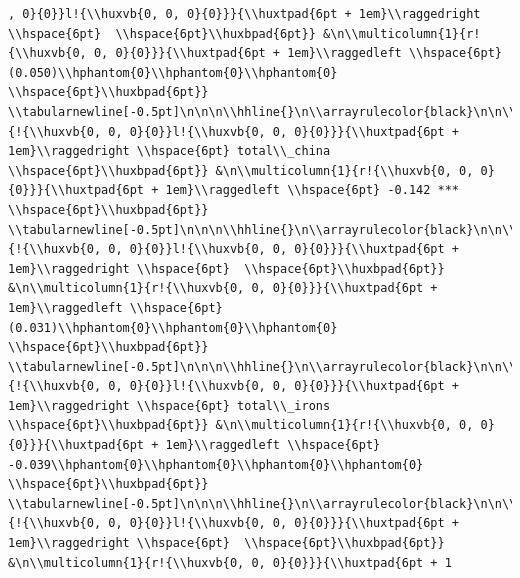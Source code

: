 \documentclass[11pt,preprint, authoryear]{elsarticle}
\numberwithin{equation}{section}
\numberwithin{figure}{section}
\numberwithin{table}{section}
\begin{document}
\begin{verbatim}
, 0}{0}}l!{\\huxvb{0, 0, 0}{0}}}{\\huxtpad{6pt + 1em}\\raggedright \\hspace{6pt}  \\hspace{6pt}\\huxbpad{6pt}} &\n\\multicolumn{1}{r!{\\huxvb{0, 0, 0}{0}}}{\\huxtpad{6pt + 1em}\\raggedleft \\hspace{6pt} (0.050)\\hphantom{0}\\hphantom{0}\\hphantom{0} \\hspace{6pt}\\huxbpad{6pt}} \\tabularnewline[-0.5pt]\n\n\n\\hhline{}\n\\arrayrulecolor{black}\n\n\\multicolumn{1}{!{\\huxvb{0, 0, 0}{0}}l!{\\huxvb{0, 0, 0}{0}}}{\\huxtpad{6pt + 1em}\\raggedright \\hspace{6pt} total\\_china \\hspace{6pt}\\huxbpad{6pt}} &\n\\multicolumn{1}{r!{\\huxvb{0, 0, 0}{0}}}{\\huxtpad{6pt + 1em}\\raggedleft \\hspace{6pt} -0.142 *** \\hspace{6pt}\\huxbpad{6pt}} \\tabularnewline[-0.5pt]\n\n\n\\hhline{}\n\\arrayrulecolor{black}\n\n\\multicolumn{1}{!{\\huxvb{0, 0, 0}{0}}l!{\\huxvb{0, 0, 0}{0}}}{\\huxtpad{6pt + 1em}\\raggedright \\hspace{6pt}  \\hspace{6pt}\\huxbpad{6pt}} &\n\\multicolumn{1}{r!{\\huxvb{0, 0, 0}{0}}}{\\huxtpad{6pt + 1em}\\raggedleft \\hspace{6pt} (0.031)\\hphantom{0}\\hphantom{0}\\hphantom{0} \\hspace{6pt}\\huxbpad{6pt}} \\tabularnewline[-0.5pt]\n\n\n\\hhline{}\n\\arrayrulecolor{black}\n\n\\multicolumn{1}{!{\\huxvb{0, 0, 0}{0}}l!{\\huxvb{0, 0, 0}{0}}}{\\huxtpad{6pt + 1em}\\raggedright \\hspace{6pt} total\\_irons \\hspace{6pt}\\huxbpad{6pt}} &\n\\multicolumn{1}{r!{\\huxvb{0, 0, 0}{0}}}{\\huxtpad{6pt + 1em}\\raggedleft \\hspace{6pt} -0.039\\hphantom{0}\\hphantom{0}\\hphantom{0}\\hphantom{0} \\hspace{6pt}\\huxbpad{6pt}} \\tabularnewline[-0.5pt]\n\n\n\\hhline{}\n\\arrayrulecolor{black}\n\n\\multicolumn{1}{!{\\huxvb{0, 0, 0}{0}}l!{\\huxvb{0, 0, 0}{0}}}{\\huxtpad{6pt + 1em}\\raggedright \\hspace{6pt}  \\hspace{6pt}\\huxbpad{6pt}} &\n\\multicolumn{1}{r!{\\huxvb{0, 0, 0}{0}}}{\\huxtpad{6pt + 1
\end{verbatim}
\end{document}
